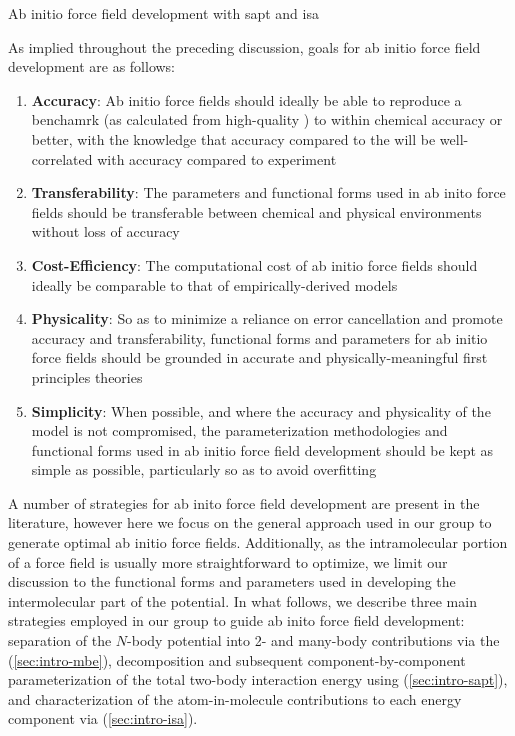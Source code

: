 \begin{section}{Ab initio force field development with \acrshort{sapt} and
\acrshort{isa}}

As implied throughout the preceding discussion, goals for ab
initio force field development are as follows:
\begin{enumerate}
\item \textbf{Accuracy}: 
Ab initio force fields should
ideally be able to reproduce a benchamrk \pes (as calculated from high-quality
\est) to within chemical accuracy or better, with the knowledge that accuracy
compared to the \pes will be well-correlated with accuracy compared to
experiment
\item \textbf{Transferability}: The parameters and
functional forms used in ab inito force fields should be transferable between
chemical and physical environments without loss of accuracy
\item \textbf{Cost-Efficiency}: 
The computational cost of ab initio force fields should ideally be comparable to that
of empirically-derived models
\item \textbf{Physicality}: So as to minimize a reliance on error cancellation
and promote accuracy and transferability, functional forms and parameters for
ab initio force fields should be grounded in accurate and
physically-meaningful first principles theories
\item \textbf{Simplicity}: When possible, and where the accuracy and
physicality of the model is not compromised, the parameterization methodologies
and functional forms used in ab initio force field development should be kept
as simple as possible, particularly so as to avoid overfitting
\end{enumerate}

A number of strategies for ab inito force field development are present in the
literature,\cite{Stone2007,Ballone2014} however here we focus on the general
approach used in our group\cite{Schmidt2015} to generate
optimal ab initio force fields. Additionally,
as the intramolecular portion of a force field is
usually more straightforward to optimize,\cite{} we limit our discussion to
the functional forms and parameters used in developing the intermolecular part
of the potential.
In what follows, we describe three main strategies employed in our group to
guide ab inito force field development: separation of the $N$-body
potential into 2- and many-body contributions via the \mbe (\cref{sec:intro-mbe}), decomposition and
subsequent component-by-component parameterization of the total two-body
interaction energy using \sapt (\cref{sec:intro-sapt}), and characterization
of the atom-in-molecule contributions to each energy component via \isa
(\cref{sec:intro-isa}).


\end{section}
